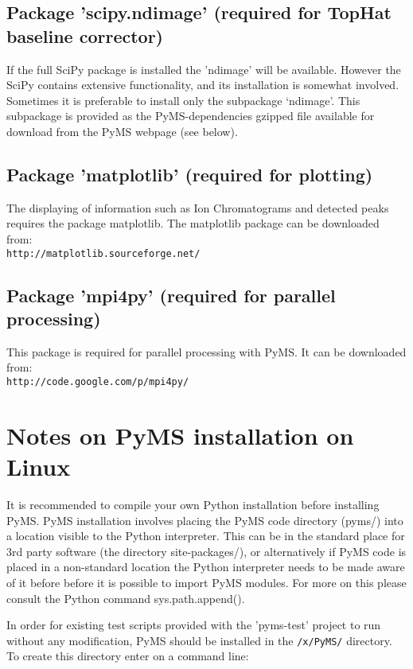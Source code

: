 \subsection{\label{subsec:scipy-ndmage}Package 'scipy.ndimage' (required
for TopHat baseline corrector)}

If the full SciPy package is installed the 'ndimage' will be available.
However the SciPy contains extensive functionality, and its installation
is somewhat involved. Sometimes it is preferable to install only the
subpackage `ndimage'. This subpackage is provided as the PyMS-dependencies
gzipped file available for download from the PyMS webpage (see below).

\subsection{\label{subsec:matplotlib}Package 'matplotlib' (required 
for plotting)}

The displaying of information such as Ion Chromatograms and detected
peaks requires the package matplotlib. The matplotlib package can be
downloaded from:\\
{\tt http://matplotlib.sourceforge.net/}

\subsection{\label{subsec:mpi4py}Package 'mpi4py' (required 
for parallel processing)}

This package is required for parallel processing with PyMS. It can be
downloaded from:\\
{\tt http://code.google.com/p/mpi4py/}

\section{Notes on PyMS installation on Linux}

It is recommended to compile your own Python installation before installing
PyMS. PyMS installation involves placing the PyMS code directory (pyms/)
into a location visible to the Python interpreter. This can be in the
standard place for 3rd party software (the directory site-packages/), or
alternatively if PyMS code is placed in a non-standard location the
Python interpreter needs to be made aware of it before before it is
possible to import PyMS modules. For more on this please consult the
Python command sys.path.append().

In order for existing test scripts provided with the 'pyms-test' project
to run without any modification, PyMS should be installed in the
{\tt /x/PyMS/} directory. To create this directory enter on a command
line:

